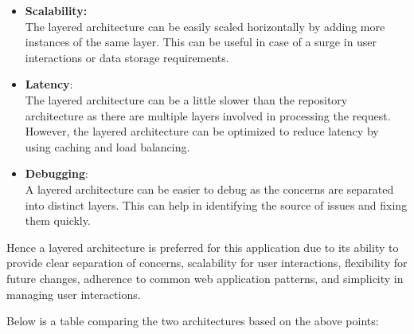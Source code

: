 \documentclass[11pt]{article}
\begin{document}
\begin{itemize}
    \item \textbf{Scalability:}\\
          The layered architecture can be easily scaled horizontally by adding more instances of the same layer. This can be useful in case of a surge in user interactions or data storage requirements.
    \item \textbf{Latency}:\\
          The layered architecture can be a little slower than the repository architecture as there are multiple layers involved in processing the request. However, the layered architecture can be optimized to reduce latency by using caching and load balancing.
    \item \textbf{Debugging}:\\
          A layered architecture can be easier to debug as the concerns are separated into distinct layers. This can help in identifying the source of issues and fixing them quickly.
\end{itemize}
Hence a layered architecture is preferred for this application due to its ability to provide clear separation of concerns, scalability for user interactions, flexibility for future changes, adherence to common web application patterns, and simplicity in managing user interactions.

Below is a table comparing the two architectures based on the above points:
\end{document}
